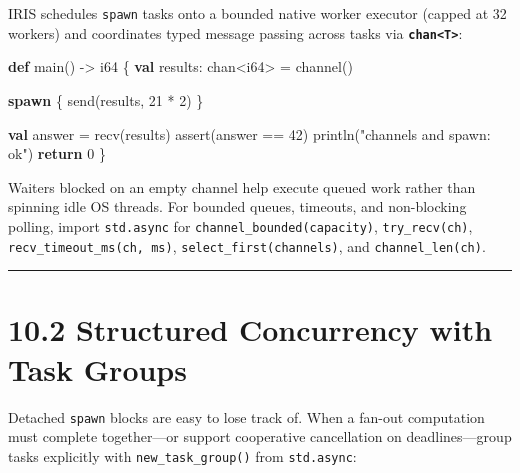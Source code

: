 \documentclass[
  english,
  oneside]{book}
\newenvironment{Shaded}{\begin{snugshade}}{\end{snugshade}}
\newcommand{\ControlFlowTok}[1]{\textcolor[rgb]{0.77,0.53,0.75}{\textbf{#1}}}
\newcommand{\DataTypeTok}[1]{\textcolor[rgb]{0.31,0.79,0.69}{#1}}
\newcommand{\DecValTok}[1]{\textcolor[rgb]{0.71,0.81,0.66}{#1}}
\newcommand{\FunctionTok}[1]{\textcolor[rgb]{0.86,0.86,0.67}{#1}}
\newcommand{\KeywordTok}[1]{\textcolor[rgb]{0.34,0.61,0.84}{\textbf{#1}}}
\newcommand{\NormalTok}[1]{\textcolor[rgb]{0.83,0.83,0.83}{#1}}
\newcommand{\OperatorTok}[1]{\textcolor[rgb]{0.83,0.83,0.83}{#1}}
\newcommand{\StringTok}[1]{\textcolor[rgb]{0.81,0.57,0.47}{#1}}
\begin{document}
IRIS schedules \texttt{spawn} tasks onto a bounded native worker
executor (capped at 32 workers) and coordinates typed message passing
across tasks via \textbf{\texttt{chan\textless{}T\textgreater{}}}:

\begin{Shaded}
\begin{Highlighting}[]
\KeywordTok{def}\NormalTok{ main() }\OperatorTok{{-}\textgreater{}} \DataTypeTok{i64}\NormalTok{ \{}
    \KeywordTok{val}\NormalTok{ results: }\DataTypeTok{chan}\OperatorTok{\textless{}}\DataTypeTok{i64}\OperatorTok{\textgreater{}} \OperatorTok{=} \FunctionTok{channel}\NormalTok{()}

    \KeywordTok{spawn}\NormalTok{ \{}
        \FunctionTok{send}\NormalTok{(results, }\DecValTok{21} \OperatorTok{*} \DecValTok{2}\NormalTok{)}
\NormalTok{    \}}

    \KeywordTok{val}\NormalTok{ answer }\OperatorTok{=} \FunctionTok{recv}\NormalTok{(results)}
    \FunctionTok{assert}\NormalTok{(answer }\OperatorTok{==} \DecValTok{42}\NormalTok{)}
\NormalTok{    println(}\StringTok{"channels and spawn: ok"}\NormalTok{)}
    \ControlFlowTok{return} \DecValTok{0}
\NormalTok{\}}
\end{Highlighting}
\end{Shaded}

Waiters blocked on an empty channel help execute queued work rather than
spinning idle OS threads. For bounded queues, timeouts, and non-blocking
polling, import \texttt{std.async} for
\texttt{channel\_bounded(capacity)}, \texttt{try\_recv(ch)},
\texttt{recv\_timeout\_ms(ch,\ ms)}, \texttt{select\_first(channels)},
and \texttt{channel\_len(ch)}.

\begin{center}\rule{0.5\linewidth}{0.5pt}\end{center}

\section{10.2 Structured Concurrency with Task
Groups}\label{structured-concurrency-with-task-groups}

Detached \texttt{spawn} blocks are easy to lose track of. When a fan-out
computation must complete together---or support cooperative cancellation
on deadlines---group tasks explicitly with \texttt{new\_task\_group()}
from \texttt{std.async}:
\end{document}
